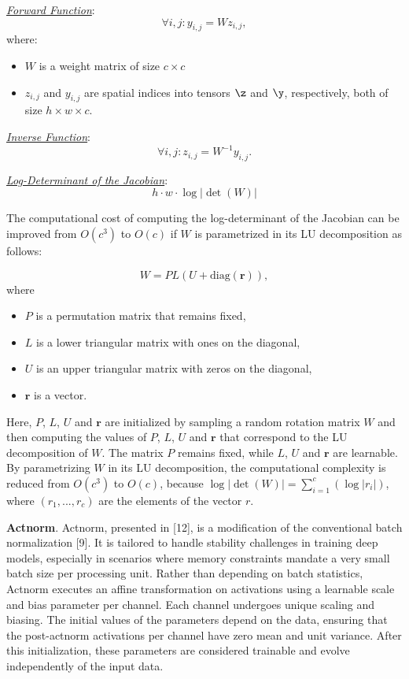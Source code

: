 \smallskip

\textit{\underline{Forward Function}}:
\[
\forall i,j : y_{i,j} = Wz_{i,j},
\]
where:
\begin{itemize}
    \item \(W\) is a weight matrix of size $c \times c$ %
    \item \(z_{i,j}\) and \(y_{i,j}\) are spatial indices into tensors \(\z\) and \(\y\), respectively, both of size  $h \times w \times c$.   
\end{itemize}

\textit{\underline{Inverse Function}}:
\[
\forall i,j : z_{i,j} = W^{-1}y_{i,j}.
\]

\textit{\underline{Log-Determinant of the Jacobian}}:
\[h \cdot w \cdot \log | \det(W)|\]

The computational cost of computing the log-determinant of the Jacobian can be improved from \( O(c^3) \) to \( O(c) \) if $W$ is parametrized in its LU decomposition as follows:

\[ W = PL(U + \text{diag}(\textbf{r})), \] 
where
\begin{itemize} \item \( P \) is a permutation matrix that remains fixed, \item \( L \) is a lower triangular matrix with ones on the diagonal, \item \( U \) is an upper triangular matrix with zeros on the diagonal, \item \( \textbf{r} \) is a vector. \end{itemize}

Here, $P$, $L$, $U$ and \( \textbf{r} \) are initialized by sampling a random rotation matrix $W$ and then computing the values of $P$, $L$, $U$ and \( \textbf{r} \) that correspond to the LU decomposition of $W$. The matrix $P$ remains fixed, while $L$, $U$ and \( \textbf{r} \) are learnable. By parametrizing $W$ in its LU decomposition, the computational complexity is reduced from \( O(c^3) \) to \( O(c) \), because $\log | \det(W)| = \sum_{i=1}^{c}(\log |r_i|)$, where $(r_1,...,r_c)$ are the elements of the vector $r$.

\smallskip

\textbf{Actnorm}. Actnorm, presented in [12], is a modification of the conventional batch normalization [9]. It is tailored to handle stability challenges in training deep models, especially in scenarios where memory constraints mandate a very small batch size per processing unit. Rather than depending on batch statistics, Actnorm executes an affine transformation on activations using a learnable scale and bias parameter per channel. Each channel undergoes unique scaling and biasing. The initial values of the parameters depend on the data, ensuring that the post-actnorm activations per channel have zero mean and unit variance. After this initialization, these parameters are considered trainable and evolve independently of the input data.

